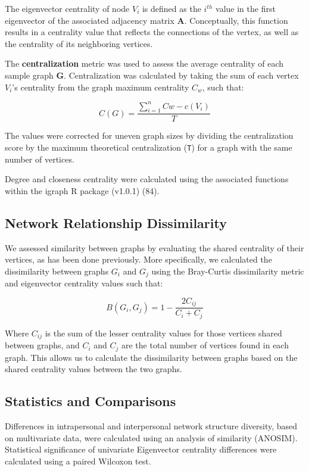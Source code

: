 \documentclass[12pt,]{article}
\begin{document}
The eigenvector centrality of node \(V_i\) is defined as the \(i^{th}\)
value in the first eigenvector of the associated adjacency matrix
\(\mathbf{A}\). Conceptually, this function results in a centrality
value that reflects the connections of the vertex, as well as the
centrality of its neighboring vertices.

The \textbf{centralization} metric was used to assess the average
centrality of each sample graph \(\mathbf{G}\). Centralization was
calculated by taking the sum of each vertex \(V_{i}\)'s centrality from
the graph maximum centrality \(C_{w}\), such that:

\[ C\left( G \right) =\frac { \sum _{ i=1 }^{ n }{ Cw -c\left( { V }_{ i } \right)  }  }{ { T } }  \]

The values were corrected for uneven graph sizes by dividing the
centralization score by the maximum theoretical centralization
(\texttt{T}) for a graph with the same number of vertices.

Degree and closeness centrality were calculated using the associated
functions within the igraph R package (v1.0.1) (84).

\subsection{Network Relationship
Dissimilarity}\label{network-relationship-dissimilarity}

We assessed similarity between graphs by evaluating the shared
centrality of their vertices, as has been done previously. More
specifically, we calculated the dissimilarity between graphs \(G_{i}\)
and \(G_{j}\) using the Bray-Curtis dissimilarity metric and eigenvector
centrality values such that:

\[ B\left( { G }_{ i },{ G }_{ j } \right) =1-\frac { 2{ C }_{ ij } }{ { C }_{ i }+{ C }_{ j } } \]

Where \(C_{ij}\) is the sum of the lesser centrality values for those
vertices shared between graphs, and \(C_{i}\) and \(C_{j}\) are the
total number of vertices found in each graph. This allows us to
calculate the dissimilarity between graphs based on the shared
centrality values between the two graphs.

\subsection{Statistics and
Comparisons}\label{statistics-and-comparisons}

Differences in intrapersonal and interpersonal network structure
diversity, based on multivariate data, were calculated using an analysis
of similarity (ANOSIM). Statistical significance of univariate
Eigenvector centrality differences were calculated using a paired
Wilcoxon test.
\end{document}
